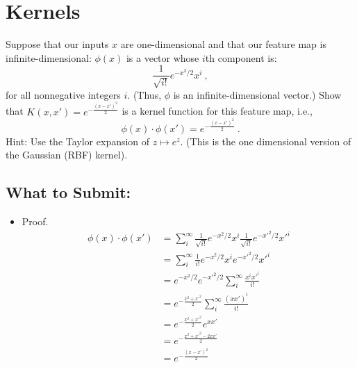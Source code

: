 \documentclass{article}
\begin{document}
\section*{Kernels}
\begin{aprob}
     Suppose that our inputs $x$ are one-dimensional and that our feature map is infinite-dimensional: 
    $\phi( x) $ is a vector whose $i$th component is:
    $$\frac{1}{\sqrt{i!}} e^{-x^2/2}x^i\ ,$$
    for all nonnegative integers $i$. (Thus, $\phi$ is an infinite-dimensional vector.)
    Show that $K(x, x') = e^{-\frac{(x-x')^2}{2}}$ is a kernel function for this feature map, i.e., 
    $$\phi (x) \cdot \phi (x') = e^{-\frac{(x-x')^2}{2}}\ .$$
    Hint: Use the Taylor expansion of $z \mapsto e^z$.
    (This is the one dimensional version of the Gaussian  (RBF) kernel).
    \subsection*{What to Submit:}
    \begin{itemize}
        \item Proof.
        \begin{align*}
            \phi (x) \cdot \phi (x') 
            &= \sum_i^\infty \frac{1}{\sqrt{i!}} e^{-x^2/2}x^i \frac{1}{\sqrt{i!}} e^{-x'^2/2}x'^i\\
            &= \sum_i^\infty \frac{1}{i!} e^{-x^2/2}x^i e^{-x'^2/2}x'^i \\
            &= e^{-x^2/2}e^{-x'^2/2} \sum_i^\infty \frac{x^i x'^i}{i!} \\
            &= e^{-\frac{x^2+x'^2}{2}} \sum_{i}^{\infty}\frac{(xx')^i}{i!} \\
            &= e^{-\frac{x^2+x'^2}{2}} e^{xx'} \\
            &= e^{-\frac{x^2+x'^2 - 2xx'}{2}} \\
            &= e^{-\frac{(x-x')^2}{2}}
        \end{align*}
    \end{itemize}
\end{aprob}
\end{document}
